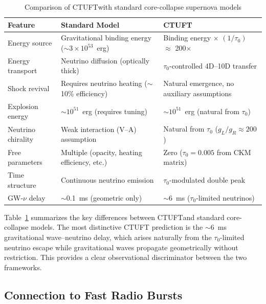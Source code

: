 \documentclass[twocolumn, tightenlines, showpacs, showkeys, nofootinbib]{revtex4-1}
\newcommand{\ctuft}{\textsc{CTUFT}}
\newcommand{\tauzero}{\tau_0}
\begin{document}
\begin{table}[t]
    \centering
    \caption{Comparison of \ctuft with standard core-collapse supernova models}
    \label{tab:model_comparison}
    \begin{tabular}{p{3.5cm}p{5cm}p{5cm}}
        \toprule
        Feature & Standard Model & \ctuft \\
        \midrule
        Energy source & Gravitational binding energy ($\sim$$3\times10^{53}$~erg) & 
                       Binding energy $\times$ $(1/\tauzero)$ $\approx$ 200$\times$ \\
        Energy transport & Neutrino diffusion (optically thick) & 
                          $\tauzero$-controlled 4D--10D transfer \\
        Shock revival & Requires neutrino heating ($\sim$10\% efficiency) & 
                       Natural emergence, no auxiliary assumptions \\
        Explosion energy & $\sim$$10^{51}$~erg (requires tuning) & 
                         $\sim$$10^{51}$~erg (natural from $\tauzero$) \\
        Neutrino chirality & Weak interaction (V--A) assumption & 
                            Natural from $\tauzero$ ($g_L/g_R \approx 200$) \\
        Free parameters & Multiple (opacity, heating efficiency, etc.) & 
                         Zero ($\tauzero = 0.005$ from CKM matrix) \\
        Time structure & Continuous neutrino emission & 
                        $\tauzero$-modulated double peak \\
        GW-$\nu$ delay & $\sim$0.1~ms (geometric only) & 
                        $\sim$6~ms ($\tauzero$-limited neutrinos) \\
        \bottomrule
    \end{tabular}
\end{table}

Table~\ref{tab:model_comparison} summarizes the key differences between 
\ctuft and standard core-collapse models. The most distinctive \ctuft 
prediction is the $\sim$6~ms gravitational wave--neutrino delay, which 
arises naturally from the $\tauzero$-limited neutrino escape while 
gravitational waves propagate geometrically without restriction. This 
provides a clear observational discriminator between the two frameworks.

\subsection{Connection to Fast Radio Bursts}
\end{document}
